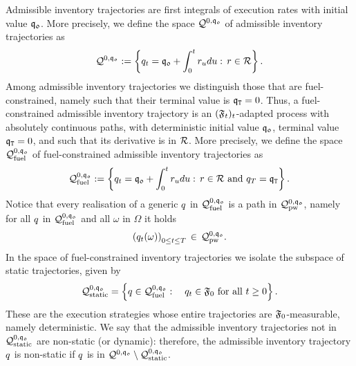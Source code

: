 \documentclass[10pt,a4paper]{article}
\begin{document}
	Admissible inventory trajectories are first integrals of execution rates with initial value $\mathfrak{q_0}$. More precisely, we define the space $\mathcal{Q}^{0,\mathfrak{q_0}}$ of admissible inventory trajectories as 
	\begin{equation}\label{eq.definitionOfSpaceInventoryTrajectories}
	\mathcal{Q}^{0,\mathfrak{q_0}} 
	:=
	\left\lbrace
	q_t=\mathfrak{q_0} + \int_{0}^{t}r_u du: \, r \in \mathcal{R}
	\right\rbrace.
	\end{equation}
	Among admissible inventory trajectories we distinguish those that are fuel-constrained, namely such that their terminal value is $\mathfrak{q}_{\mathtt{T} }=0$. Thus, a fuel-constrained admissible inventory trajectory is an $(\mathfrak{F}_t)_t$-adapted process with absolutely continuous paths, with deterministic initial value $\mathfrak{q_0}$,  terminal value $\mathfrak{q}_{\mathtt{T} }=0$, and such that its derivative is in $\mathcal{R}$.  More precisely, we define the space $\mathcal{Q}_{\text{fuel}}^{0,\mathfrak{q_0}}$ of fuel-constrained admissible inventory trajectories as 
	\begin{equation*}
	\mathcal{Q}_{\text{fuel}}^{0,\mathfrak{q_0}}:= \left\lbrace
	q_t=\mathfrak{q_0} + \int_{0}^{t}r_u du: \, r \in \mathcal{R} \text{ and } q_T = \mathfrak{q}_{\mathtt{T} }
	\right\rbrace.
	\end{equation*}
	Notice that every realisation of a generic $q$ in $\mathcal{Q}_{\text{fuel}}^{0,\mathfrak{q_0}}$ is a path in $\mathcal{Q}^{0,\mathfrak{q_0}}_{\text{pw}}$, namely for all $q$ in $\mathcal{Q}_{\text{fuel}}^{0,\mathfrak{q_0}}$ and all $\omega$ in $\Omega$ it holds
	\begin{equation*}
	\left(q_t(\omega)\right)_{0\leq t \leq T} \, \in \, \mathcal{Q}^{0,\mathfrak{q_0}}_{\text{pw}}.
	\end{equation*}
	In the space of fuel-constrained inventory trajectories we isolate the subspace of static trajectories, given by
	\begin{equation*}
	\mathcal{Q}_{\text{static}}^{0,\mathfrak{q_0}} = 
	\left\lbrace q \in \mathcal{Q}_{\text{fuel}}^{0,\mathfrak{q_0}}: \quad 
	q_t \in \mathfrak{F}_0 \text{ for all } t \geq 0 \right\rbrace.
	\end{equation*}
	These are the execution strategies whose entire trajectories are $\mathfrak{F}_0$-measurable, namely deterministic. We say that the admissible inventory trajectories not in $	\mathcal{Q}_{\text{static}}^{0,\mathfrak{q_0}}$ are non-static (or dynamic): therefore, the admissible inventory trajectory $q$ is non-static if $q$ is in  $\mathcal{Q}^{0,\mathfrak{q_0}}\setminus \mathcal{Q}_{\text{static}}^{0,\mathfrak{q_0}}$.
	
\end{document}
